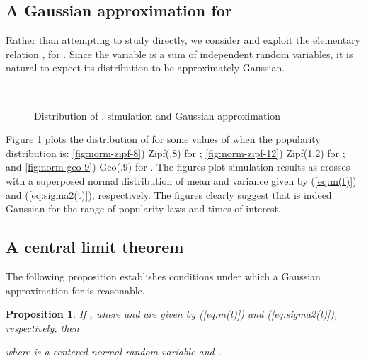 \documentclass{amsart}
\newtheorem{proposition}{Proposition}
\begin{document}
\subsection{A Gaussian approximation for }
Rather than attempting to study  directly, we consider  and exploit the  elementary relation , for . Since  the variable  is a sum of independent random variables,  it is natural to expect its distribution to be approximately Gaussian.  




\begin{figure}
\     \vspace{-8mm}\hspace{-2cm}
 \\ 
   \caption{Distribution of , simulation and Gaussian approximation}
         \vspace{-5mm}

     \label{fig:normal}
\end{figure}


Figure \ref{fig:normal}  plots the distribution of  for some values of  when the popularity distribution  is: \ref{fig:norm-zipf-8})  Zipf(.8) for ; \ref{fig:norm-zipf-12}) Zipf(1.2) for ; and \ref{fig:norm-geo-9}) Geo(.9) for . The figures plot simulation results as crosses with a superposed normal distribution of mean and variance given by (\ref{eq:m(t)}) and (\ref{eq:sigma2(t)}), respectively. The figures clearly suggest that  is indeed Gaussian for the range of popularity laws and times  of interest. 

\subsection{A central limit theorem}

The following proposition establishes conditions under which a Gaussian approximation for  is reasonable. 

\begin{proposition}\label{Central} If 
, where  and   are given by (\ref{eq:m(t)}) and (\ref{eq:sigma2(t)}), respectively, then

where  is a centered normal random variable and .
\end{proposition}
\end{document}
